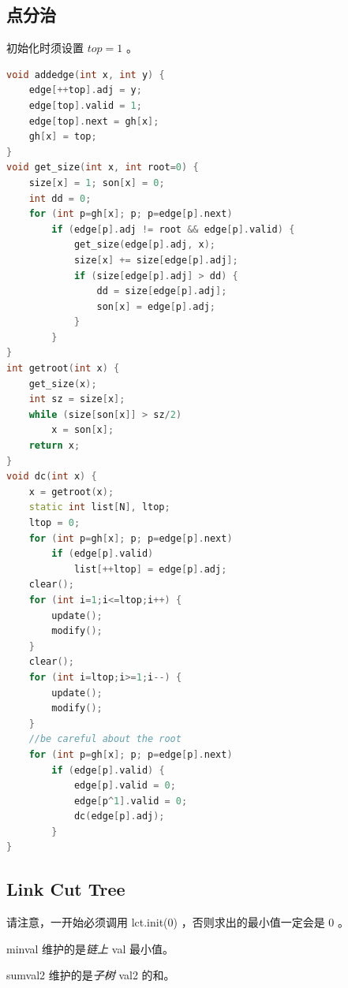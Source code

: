 \documentclass{article}
\begin{document}
\subsection{点分治}
初始化时须设置 $top = 1$ 。
\begin{lstlisting}[language=C++]
void addedge(int x, int y) {
	edge[++top].adj = y;
	edge[top].valid = 1;
	edge[top].next = gh[x];
	gh[x] = top;
}
void get_size(int x, int root=0) {
	size[x] = 1; son[x] = 0;
	int dd = 0;
	for (int p=gh[x]; p; p=edge[p].next)
		if (edge[p].adj != root && edge[p].valid) {
			get_size(edge[p].adj, x);
			size[x] += size[edge[p].adj];
			if (size[edge[p].adj] > dd) {
				dd = size[edge[p].adj];
				son[x] = edge[p].adj;
			}
		}
}
int getroot(int x) {
	get_size(x);
	int sz = size[x];
	while (size[son[x]] > sz/2)
		x = son[x];
	return x;
}
void dc(int x) {
	x = getroot(x);
	static int list[N], ltop;
	ltop = 0;
	for (int p=gh[x]; p; p=edge[p].next)
		if (edge[p].valid)
			list[++ltop] = edge[p].adj;
	clear();
	for (int i=1;i<=ltop;i++) {
		update();
		modify();
	}
	clear();
	for (int i=ltop;i>=1;i--) {
		update();
		modify();
	}
	//be careful about the root
	for (int p=gh[x]; p; p=edge[p].next)
		if (edge[p].valid) {
			edge[p].valid = 0;
			edge[p^1].valid = 0;
			dc(edge[p].adj);
		}
}
\end{lstlisting}
\subsection{Link Cut Tree}

请注意，一开始必须调用 lct.init(0) ，否则求出的最小值一定会是 0 。

minval 维护的是\emph{链上} val 最小值。

sumval2 维护的是\emph{子树} val2 的和。
\end{document}
